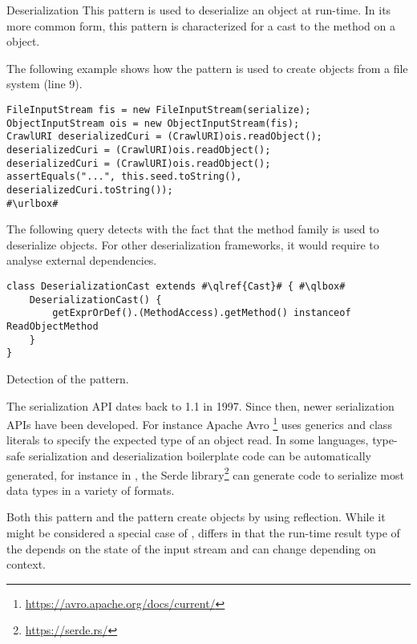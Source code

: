 \begin{pattern}{Deserialization}
This pattern is used to deserialize an object at run-time.
In its more common form,
this pattern is characterized for a cast to the  method on a  object.

\instances{}
The following example shows how the \thisp{} pattern is used to create objects from a file system (line 9).

\def\urlvar{http://bit.ly/internetarchive_heritrix3_2SF4j7k}
\begin{verbatim}
FileInputStream fis = new FileInputStream(serialize);
ObjectInputStream ois = new ObjectInputStream(fis);
CrawlURI deserializedCuri = (CrawlURI)ois.readObject();
deserializedCuri = (CrawlURI)ois.readObject();
deserializedCuri = (CrawlURI)ois.readObject();
assertEquals("...", this.seed.toString(), deserializedCuri.toString());
#\urlbox#
\end{verbatim}


\detection{}
The following query detects \thisp{} with the fact that the  method family is used to deserialize objects.
For other deserialization frameworks,
it would require to analyse external dependencies.

\begin{listing}
\begin{verbatim}
class DeserializationCast extends #\qlref{Cast}# { #\qlbox#
	DeserializationCast() {
		getExprOrDef().(MethodAccess).getMethod() instanceof ReadObjectMethod
	}
}
\end{verbatim}
\caption{Detection of the \thisp{} pattern.}
\label{lst:ql:DeserializationCast}
\end{listing}


\issues{}
The serialization API dates back to \java{} 1.1 in 1997.
Since then, newer serialization APIs have been developed.
For instance Apache Avro%
\footnote{\url{https://avro.apache.org/docs/current/}}
uses generics and class literals to specify the expected type of an object read. 
In some languages,
type-safe serialization and deserialization boilerplate code can be automatically generated,
for instance in \rust{},
the Serde library\footnote{\url{https://serde.rs/}}
can generate code to serialize most data types
in a variety of formats.

Both this pattern and the  pattern create objects by using reflection.
While it might be considered a special case of , 
\thisp{} differs in that the run-time result type of the  depends on the state of the input stream and can change depending on context.
 
\end{pattern}